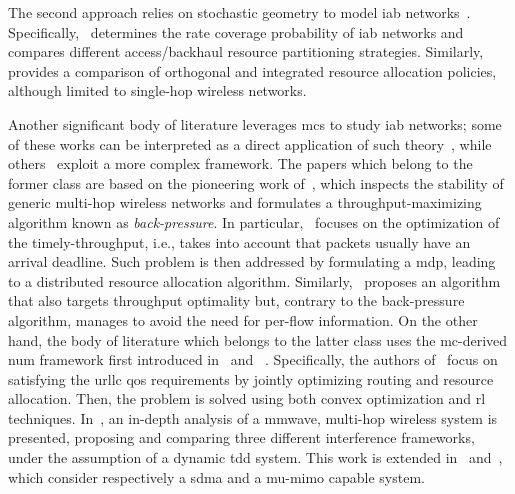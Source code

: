 The second approach relies on stochastic geometry to model \gls{iab} networks~\cite{stoch_geom1, stoch_geom2}. Specifically,~\cite{stoch_geom1} determines the rate coverage probability of \gls{iab} networks and compares different access/backhaul resource partitioning strategies. Similarly,~\cite{stoch_geom2} provides a comparison of orthogonal and integrated resource allocation policies, although limited to single-hop wireless networks.  

Another significant body of literature leverages \glspl{mc} to study \gls{iab} networks; some of these works can be interpreted as a direct application of such theory~\cite{singh2018throughput, ji2012throughput}, while others~\cite{vu2018path,garcia2015analysis, gomez2016optimal, gomez2019optimal} exploit a more complex framework.  
The papers which belong to the former class are based on the  pioneering work of~\cite{tassiulas1990stability}, which inspects the stability of generic multi-hop wireless networks and formulates a throughput-maximizing algorithm known as \textit{back-pressure}. In particular,~\cite{singh2018throughput} focuses on the optimization of the timely-throughput, i.e., takes into account that packets usually have an arrival deadline. Such problem is then addressed by formulating a \gls{mdp}, leading to a distributed resource allocation algorithm. Similarly,~\cite{ji2012throughput} proposes an algorithm that also targets throughput optimality but, contrary to the back-pressure algorithm, manages to avoid the need for per-flow information.
On the other hand, the body of literature which belongs to the latter class uses the \gls{mc}-derived \gls{num} framework first introduced in~\cite{kelly1997charging} and ~\cite{kelly1998rate}. Specifically, the authors of~\cite{vu2018path} focus on satisfying the \gls{urllc} \gls{qos} requirements by jointly optimizing routing and resource allocation. Then, 
the problem is solved using both convex optimization and \gls{rl} techniques. In~\cite{garcia2015analysis}, an in-depth analysis of a \gls{mmwave}, multi-hop wireless system is presented, proposing and comparing three different interference frameworks, under the assumption of a dynamic \gls{tdd} system. This work is extended in~\cite{gomez2016optimal} and~\cite{gomez2019optimal}, which consider respectively a \gls{sdma} and a \gls{mu}-\gls{mimo} capable system.

